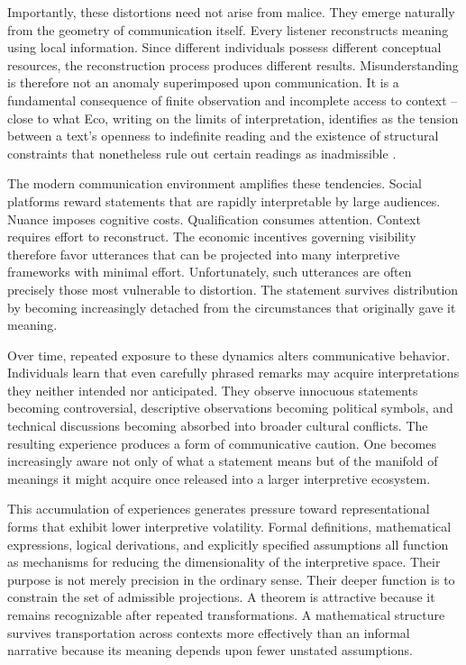 \documentclass[11pt]{article}
\theoremstyle{plain}
\begin{document}
Importantly, these distortions need not arise from malice. They emerge naturally from the geometry of communication itself. Every listener reconstructs meaning using local information. Since different individuals possess different conceptual resources, the reconstruction process produces different results. Misunderstanding is therefore not an anomaly superimposed upon communication. It is a fundamental consequence of finite observation and incomplete access to context -- close to what Eco, writing on the limits of interpretation, identifies as the tension between a text's openness to indefinite reading and the existence of structural constraints that nonetheless rule out certain readings as inadmissible \cite{eco1990}.

The modern communication environment amplifies these tendencies. Social platforms reward statements that are rapidly interpretable by large audiences. Nuance imposes cognitive costs. Qualification consumes attention. Context requires effort to reconstruct. The economic incentives governing visibility therefore favor utterances that can be projected into many interpretive frameworks with minimal effort. Unfortunately, such utterances are often precisely those most vulnerable to distortion. The statement survives distribution by becoming increasingly detached from the circumstances that originally gave it meaning.

Over time, repeated exposure to these dynamics alters communicative behavior. Individuals learn that even carefully phrased remarks may acquire interpretations they neither intended nor anticipated. They observe innocuous statements becoming controversial, descriptive observations becoming political symbols, and technical discussions becoming absorbed into broader cultural conflicts. The resulting experience produces a form of communicative caution. One becomes increasingly aware not only of what a statement means but of the manifold of meanings it might acquire once released into a larger interpretive ecosystem.

This accumulation of experiences generates pressure toward representational forms that exhibit lower interpretive volatility. Formal definitions, mathematical expressions, logical derivations, and explicitly specified assumptions all function as mechanisms for reducing the dimensionality of the interpretive space. Their purpose is not merely precision in the ordinary sense. Their deeper function is to constrain the set of admissible projections. A theorem is attractive because it remains recognizable after repeated transformations. A mathematical structure survives transportation across contexts more effectively than an informal narrative because its meaning depends upon fewer unstated assumptions.
\end{document}
